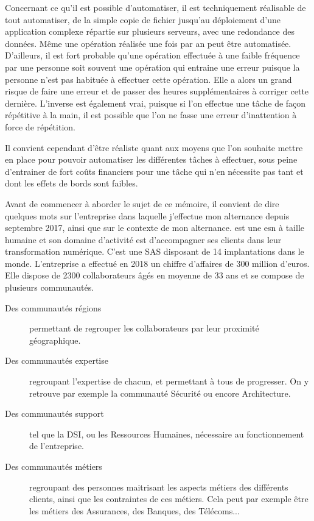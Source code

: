 Concernant ce qu'il est possible d'automatiser, il est techniquement réalisable de tout automatiser, de la simple copie de fichier jusqu'au déploiement d'une application complexe répartie sur plusieurs serveurs, avec une redondance des données. Même une opération réalisée une fois par an peut être automatisée. D'ailleurs, il est fort probable qu'une opération effectuée à une faible fréquence par une personne soit souvent une opération qui entraine une erreur puisque la personne n'est pas habituée à effectuer cette opération. Elle a alors un grand risque de faire une erreur et de passer des heures supplémentaires à corriger cette dernière. L'inverse est également vrai, puisque si l'on effectue une tâche de façon répétitive à la main, il est possible que l'on ne fasse une erreur d'inattention à force de répétition. 

Il convient cependant d'être réaliste quant aux moyens que l'on souhaite mettre en place pour pouvoir automatiser les différentes tâches à effectuer, sous peine d'entrainer de fort coûts financiers pour une tâche qui n'en nécessite pas tant et dont les effets de bords sont faibles.

Avant de commencer à aborder le sujet de ce mémoire, il convient de dire quelques mots sur l'entreprise dans laquelle j'effectue mon alternance depuis septembre 2017, \onepoint{} ainsi que sur le contexte de mon alternance. \xmakefirstuc{\onepoint{}} est une \gls{esn} à taille humaine et son domaine d'activité est d'accompagner ses clients dans leur transformation numérique. C'est une \gls{SAS} disposant de 14 implantations dans le monde. L'entreprise a effectué en 2018 un chiffre d'affaires de 300 million d'euros. Elle dispose de 2300 collaborateurs âgés en moyenne de 33 ans et se compose de plusieurs communautés.

\begin{description}
	\item [Des communautés régions] permettant de regrouper les collaborateurs par leur proximité géographique.
	\item [Des communautés expertise] regroupant l'expertise de chacun, et permettant à tous de progresser. On y retrouve par exemple la communauté Sécurité ou encore Architecture.
	\item [Des communautés support] tel que la \gls{DSI}, ou les Ressources Humaines, nécessaire au fonctionnement de l'entreprise.
	\item [Des communautés métiers] regroupant des personnes maitrisant les aspects métiers des différents clients, ainsi que les contraintes de ces métiers. Cela peut par exemple être les métiers des Assurances, des Banques, des Télécoms... 
\end{description}


